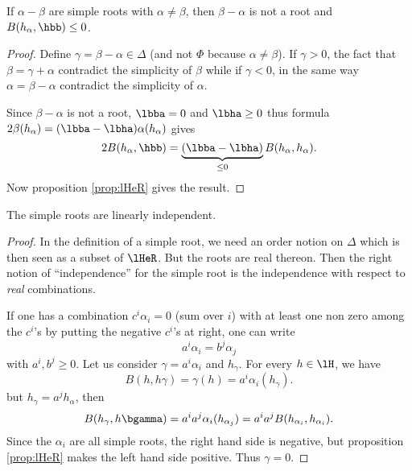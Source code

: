 \begin{lemma}
    If $\alpha-\beta$ are simple roots with $\alpha\neq\beta$, then $\beta-\alpha$ is not a root and $B( h_{\alpha},\hbb)\leq 0$.
\end{lemma}

\begin{proof}
    Define $\gamma=\beta-\alpha\in\Delta$ (and not $\Phi$ because $\alpha\neq\beta$). If $\gamma>0$, the fact that $\beta=\gamma+\alpha$ contradict the simplicity of $\beta$ while if $\gamma<0$, in the same way $\alpha=\beta-\alpha$ contradict the simplicity of $\alpha$.

    Since $\beta-\alpha$ is not a root, $\lbba=0$ and $\lbha\geq 0$ thus formula $2\beta( h_{\alpha})=(\lbba-\lbha)\alpha( h_{\alpha})$ gives
    \begin{equation}
        2B( h_{\alpha},\hbb)=\underbrace{(\lbba-\lbha)}_{\leq 0}B( h_{\alpha}, h_{\alpha}).
    \end{equation}
    Now proposition \ref{prop:lHeR} gives the result.
\end{proof}

\begin{lemma}
    The simple roots are linearly independent.
\end{lemma}

\begin{proof}
    In the definition of a simple root, we need an order notion on $\Delta$ which is then seen as a subset of $\lHeR$. But the roots are real thereon. Then the right notion of ``independence''{} for the simple root is the independence with respect to \emph{real} combinations.

    If one has a combination $c^i\alpha_i=0$ (sum over $i$) with at least one non zero among the $c^i$'s  by putting the negative $c^i$'s at right, one can write
    \[
        a^i\alpha_i=b^j\alpha_j
    \]
    with $a^i,b^j\geq 0$. Let us consider $\gamma=a^i\alpha_i$ and $h_{\gamma}$. For every $h\in\lH$, we have
    \[
        B(h,h\gamma)=\gamma(h)=a^i\alpha_i(h_{\gamma}).
    \]
    but $h_{\gamma}=a^jh_{\alpha}$, then
    \begin{equation}
        B(h_{\gamma},h\bgamma)=a^ia^j\alpha_i(h_{\alpha_j})
                    =a^ia^jB(h_{\alpha_i},h_{\alpha_i}).
    \end{equation}
    Since the $\alpha_i$ are all simple roots, the right hand side is negative, but proposition \ref{prop:lHeR} makes the left hand side positive. Thus $\gamma=0$.
\end{proof}


